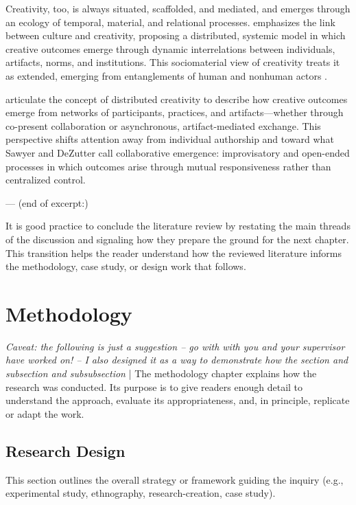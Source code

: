 \documentclass[12pt]{yorkudiss}
\begin{document}
Creativity, too, is always situated, scaffolded, and mediated, and emerges through an ecology of temporal, material, and relational processes. \textcite{glaveanu_distributed_2014} emphasizes the link between culture and creativity, proposing a distributed, systemic model in which creative outcomes emerge through dynamic interrelations between individuals, artifacts, norms, and institutions. This sociomaterial view of creativity treats it as extended, emerging from entanglements of human and nonhuman actors \parencite{suchman_human-machine_2007, ingold_making_2013}.

\textcite{sawyer_distributed_2009} articulate the concept of distributed creativity to describe how creative outcomes emerge from networks of participants, practices, and artifacts—whether through co-present collaboration or asynchronous, artifact-mediated exchange. This perspective shifts attention away from individual authorship and toward what Sawyer and DeZutter call collaborative emergence: improvisatory and open-ended processes in which outcomes arise through mutual responsiveness rather than centralized control.

--- (end of excerpt:)

It is good practice to conclude the literature review by restating the main threads of the discussion and signaling how they prepare the ground for the next chapter. This transition helps the reader understand how the reviewed literature informs the methodology, case study, or design work that follows.


\chapter{Methodology}

\textit{Caveat: the following is just a suggestion -- go with with you and your supervisor have worked on! -- I also designed it as a way to demonstrate how the section and subsection and subsubsection}
|
The methodology chapter explains how the research was conducted. Its purpose is to give readers enough detail to understand the approach, evaluate its appropriateness, and, in principle, replicate or adapt the work.  

\section{Research Design}
This section outlines the overall strategy or framework guiding the inquiry (e.g., experimental study, ethnography, research-creation, case study).  
\end{document}
